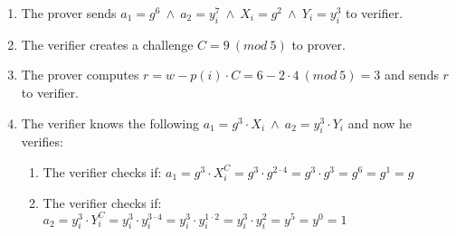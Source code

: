\begin{enumerate}
    \item The prover sends \begin{math}a_1=g^6 \ \land\ a_2=y_i^7 \ \land \ X_i=g^2 \ \land \ Y_i=y_i^3 \end{math} to verifier.
    \item The verifier creates a challenge \begin{math}C=9\ (mod \ 5) \end{math} to prover.
    \item The prover computes \begin{math}r=w-p(i)  \cdot  C = 6-2  \cdot  4 \ (mod \ 5)= 3\end{math} and sends $r$ to verifier.
    \item The verifier knows the following  \begin{math}a_1=g^3  \cdot  X_i \ \land \ a_2=y_i^3  \cdot  Y_i \end{math} and now he verifies:
    \begin{enumerate}        
        \item The verifier checks if: \begin{math}a_1 = g^3 \cdot X_i^C = g^3 \cdot g^{2 \cdot 4} = g^3  \cdot  g^3 = g^6= g^1= g\end{math}
        \item The verifier checks if: \begin{math} a_2=y_i^3  \cdot  Y_i^C = y_i^3  \cdot  y_i^{3 \cdot 4}= y_i^3  \cdot  y_i^{1 \cdot 2}= y_i^3  \cdot  y_i^2= y^5=y^0= 1 \end{math}
    \end{enumerate}
\end{enumerate}


